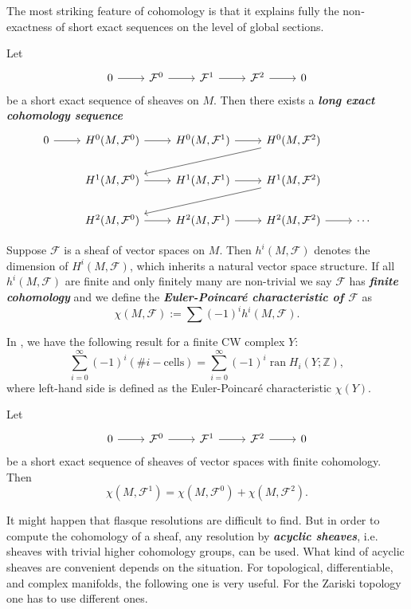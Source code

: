\documentclass{article}
\newcommand{\Z}{\mathbb{Z}}
\newcommand{\Fc}{\mathcal{F}}
\begin{document}
The most striking feature of cohomology is that it explains fully the non­ exactness of short exact sequences on the level of global sections.
\begin{prop}
	Let
	\[\begin{tikzcd}
		0\arrow[r]&\Fc^0\arrow[r]&\Fc^1\arrow[r]&\Fc^2\arrow[r]&0
	\end{tikzcd}\]
	be a short exact sequence of sheaves on $M$. Then there exists a \textbf{\textit{long exact cohomology sequence}}
	\[\begin{tikzcd}
		0\arrow[r]&H^0(M,\Fc^0)\arrow[r]&H^0(M,\Fc^1)\arrow[r]&H^0(M,\Fc^2)\arrow[dll]\\
		&H^1(M,\Fc^0)\arrow[r]&H^1(M,\Fc^1)\arrow[r]&H^1(M,\Fc^2)\arrow[dll]\\
		&H^2(M,\Fc^0)\arrow[r]&H^2(M,\Fc^1)\arrow[r]&H^2(M,\Fc^2)\arrow[r]&\cdots
	\end{tikzcd}\]
\end{prop}
\begin{defn}
	Suppose $\Fc$ is a sheaf {\color{cyan}of vector spaces} on $M$. Then $h^i(M,\Fc)$ denotes the dimension of $H^i(M,\Fc)$, which inherits a natural vector space structure. If all $h^i(M,\Fc)$ are finite and only finitely many are non-trivial we say $\Fc$ has \textbf{\textit{finite cohomology}} and we define the \textbf{\textit{Euler-Poincaré characteristic of $\Fc$}} as
	\[\chi(M,\Fc):=\sum(-1)^ih^i(M,\Fc).\]
\end{defn}
\begin{remark}
	In \cite{hatcher-at}, we have the following result for a finite CW complex $Y$:
	\[\sum_{i=0}^\infty(-1)^i(\#i-\text{cells})=\sum_{i=0}^\infty(-1)^i\operatorname{ran}H_i(Y;\Z),\]
	where left-hand side is defined as the Euler-Poincaré characteristic $\chi(Y)$.
\end{remark}
\begin{coro}
	Let
	\[\begin{tikzcd}
		0\arrow[r]&\Fc^0\arrow[r]&\Fc^1\arrow[r]&\Fc^2\arrow[r]&0
	\end{tikzcd}\]
	be a short exact sequence of sheaves of vector spaces with finite cohomology. Then
	\[\chi(M,\Fc^1)=\chi(M,\Fc^0)+\chi(M,\Fc^2).\]
\end{coro}
It might happen that flasque resolutions are difficult to find. But in order to compute the cohomology of a sheaf, any resolution by \textbf{\textit{acyclic sheaves}}, i.e. sheaves with trivial higher cohomology groups, can be used. What kind of acyclic sheaves are convenient depends on the situation. For topological, differentiable, and complex manifolds, the following one is very useful. For the Zariski topology one has to use different ones.
\end{document}
